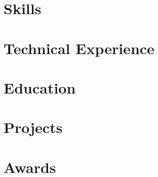 \documentclass[letter,10pt]{article}
\begin{document}


\section{Skills}


\section{Technical Experience}


\section{Education}


\section{Projects}


\section{Awards}

\end{document}
